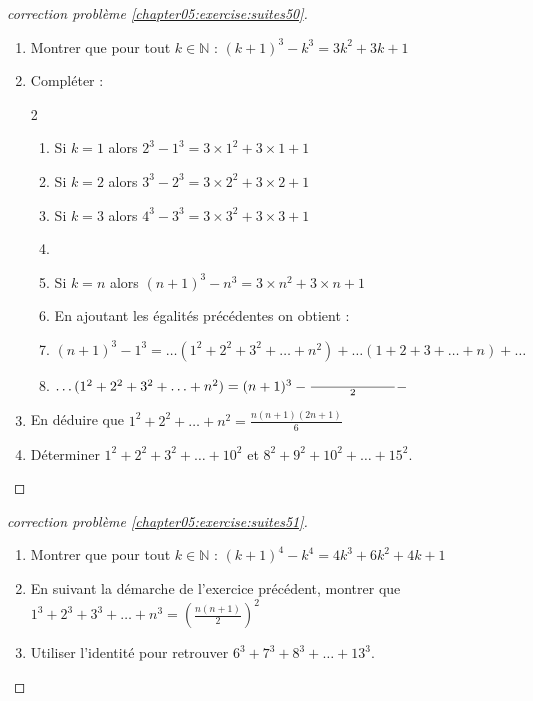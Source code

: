 \documentclass[main.tex]{subfiles}
\begin{document}
\begin{proof}[correction problème \ref{chapter05:exercise:suites50}]\hfill 
\begin{enumerate}[leftmargin=*,label=\arabic*)]
	\item Montrer que pour tout $k\in\mathbb{N}$ : $(k+1)^3-k^3=3k^2+3k+1$
	\item Compléter : 
	\begin{spacing}{2}
		\vspace{-0.5em}
		\begin{enumerate}[leftmargin=*,label={}]
			\item  Si $k=1$ alors \dotfill $2^3-1^3=3\times 1^2+ 3\times 1 + 1$
			\item  Si $k=2$ alors \dotfill $3^3-2^3=3\times 2^2+ 3\times 2 + 1$
			\item  Si $k=3$ alors \dotfill $4^3-3^3=3\times 3^2+ 3\times 3 + 1$
			\item[...] 
			\item  Si $k=n$ alors \dotfill $(n+1)^3-n^3=3\times n^2+ 3\times n + 1$
			\item En ajoutant les égalités précédentes on obtient :
			\item $(n+1)^3-1^3= \ldots (1^2+2^2+3^2+\ldots +n^2)+\ldots(1+2+3+\ldots+n) + \ldots $
			\item $\ldots (1^2+2^2+3^2+\ldots +n^2)=(n+1)^3-\frac{\qquad\qquad\qquad }{2}-\dotfill $
		\end{enumerate}
	\end{spacing}
	\vspace{-0.75em}
	\item En déduire que $1^2+2^2+\ldots +n^2=\frac{n(n+1)(2n+1)}{6}$
	\item Déterminer $1^2+2^2+3^2+\ldots +10^2$ et $8^2+9^2+10^2+\ldots+15^2$.
\end{enumerate} 
\end{proof}
\begin{proof}[correction problème \ref{chapter05:exercise:suites51}] \hfill
	\begin{enumerate}[leftmargin=*,label=\arabic*)]
		\item Montrer que pour tout $k\in\mathbb{N}$ : $(k+1)^4-k^4=4k^3+6k^2+4k+1$
		\item En suivant la démarche de l'exercice précédent, montrer que $1^3+2^3+3^3+\ldots + n^3=\left(\frac{n(n+1)}{2}\right)^2$
		\item Utiliser l'identité pour retrouver $6^3+7^3+8^3+\ldots+13^3$.
	\end{enumerate} 
\end{proof}
\end{document}
